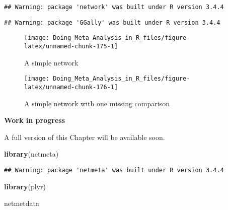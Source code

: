 \documentclass[]{book}
\newenvironment{Shaded}{\begin{snugshade}}{\end{snugshade}}
\newcommand{\KeywordTok}[1]{\textcolor[rgb]{0.13,0.29,0.53}{\textbf{#1}}}
\newcommand{\NormalTok}[1]{#1}
\theoremstyle{definition}
\theoremstyle{definition}
\theoremstyle{definition}
\theoremstyle{remark}
\begin{document}
\begin{verbatim}
## Warning: package 'network' was built under R version 3.4.4
\end{verbatim}

\begin{verbatim}
## Warning: package 'GGally' was built under R version 3.4.4
\end{verbatim}

\begin{figure}

{\centering \texttt{[image: Doing\_Meta\_Analysis\_in\_R\_files/figure-latex/unnamed-chunk-175-1]} 

}

\caption{A simple network}\label{fig:unnamed-chunk-175}
\end{figure}

\begin{figure}

{\centering \texttt{[image: Doing\_Meta\_Analysis\_in\_R\_files/figure-latex/unnamed-chunk-176-1]} 

}

\caption{A simple network with one missing comparison}\label{fig:unnamed-chunk-176}
\end{figure}

\begin{rmdinfo}
\textbf{Work in progress}

A full version of this Chapter will be available soon.
\end{rmdinfo}

\begin{Shaded}
\begin{Highlighting}[]
\KeywordTok{library}\NormalTok{(netmeta)}
\end{Highlighting}
\end{Shaded}

\begin{verbatim}
## Warning: package 'netmeta' was built under R version 3.4.4
\end{verbatim}

\begin{Shaded}
\begin{Highlighting}[]
\KeywordTok{library}\NormalTok{(plyr)}
\end{Highlighting}
\end{Shaded}

\begin{Shaded}
\begin{Highlighting}[]
\NormalTok{netmetdata}
\end{Highlighting}
\end{Shaded}
\end{document}

